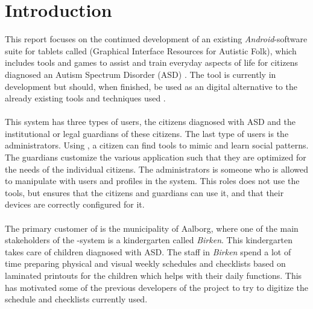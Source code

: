 \chapter{Introduction}
\label{cha:introduction}

This report focuses on the continued development of an existing \emph{Android}-software suite for tablets called \giraf (Graphical Interface Resources for Autistic Folk), which includes tools and games to assist and train everyday aspects of life for citizens diagnosed an Autism Spectrum Disorder (ASD) \parencite{asd}. The tool is currently in development but should, when finished, be used as an digital alternative to the already existing tools and techniques used \parencite{birken_slides}.
\\\\

This system has three types of users, the citizens diagnosed with ASD and the institutional or legal guardians of these citizens. The last type of users is the administrators. Using \giraf, a citizen can find tools to mimic and learn social patterns. The guardians customize the various application such that they are optimized for the needs of the individual citizens. The administrators is someone who is allowed to manipulate with users and profiles in the system. This roles does not use the tools, but ensures that the citizens and guardians can use it, and that their devices are correctly configured for it.
\\\\
The primary customer of \giraf is the municipality of Aalborg, where one of the main stakeholders of the \giraf-system is a kindergarten called \emph{Birken}. This kindergarten takes care of children diagnosed with ASD. The staff in \emph{Birken} spend a lot of time preparing physical and visual weekly schedules and checklists based on laminated printouts for the children which helps with their daily functions. This has motivated some of the previous developers of the \giraf project to try to digitize the schedule and checklists currently used. 



